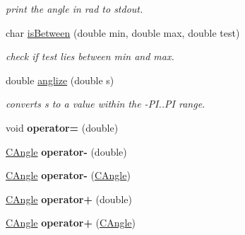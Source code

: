 \begin{DoxyCompactItemize}
\begin{DoxyCompactList}\small\item\em print the angle in rad to stdout. \item\end{DoxyCompactList}\item 
char \hyperlink{class_c_angle_ab03cb0f761ee06e80835094b5817ba94}{isBetween} (double min, double max, double test)
\begin{DoxyCompactList}\small\item\em check if test lies between min and max. \item\end{DoxyCompactList}\item 
\hypertarget{class_c_angle_a72fd75c6aad269f339e0d7fc926e7569}{
double \hyperlink{class_c_angle_a72fd75c6aad269f339e0d7fc926e7569}{anglize} (double s)}
\label{class_c_angle_a72fd75c6aad269f339e0d7fc926e7569}

\begin{DoxyCompactList}\small\item\em converts s to a value within the -\/PI..PI range. \item\end{DoxyCompactList}\item 
\hypertarget{class_c_angle_a84945f984d1088fb0fa09b3c44b004ea}{
void {\bfseries operator=} (double)}
\label{class_c_angle_a84945f984d1088fb0fa09b3c44b004ea}

\item 
\hypertarget{class_c_angle_a9ccb59ecd849db986d78a44c69fa284a}{
\hyperlink{class_c_angle}{CAngle} {\bfseries operator-\/} (double)}
\label{class_c_angle_a9ccb59ecd849db986d78a44c69fa284a}

\item 
\hypertarget{class_c_angle_a6eb4a85cbb07d353873a34cfad48f337}{
\hyperlink{class_c_angle}{CAngle} {\bfseries operator-\/} (\hyperlink{class_c_angle}{CAngle})}
\label{class_c_angle_a6eb4a85cbb07d353873a34cfad48f337}

\item 
\hypertarget{class_c_angle_a0069cc4eb3577b04495b63bf1d1e2a15}{
\hyperlink{class_c_angle}{CAngle} {\bfseries operator+} (double)}
\label{class_c_angle_a0069cc4eb3577b04495b63bf1d1e2a15}

\item 
\hypertarget{class_c_angle_a3f041fc220a6d0299f4a9ee770c34af0}{
\hyperlink{class_c_angle}{CAngle} {\bfseries operator+} (\hyperlink{class_c_angle}{CAngle})}
\label{class_c_angle_a3f041fc220a6d0299f4a9ee770c34af0}

\end{DoxyCompactItemize}
